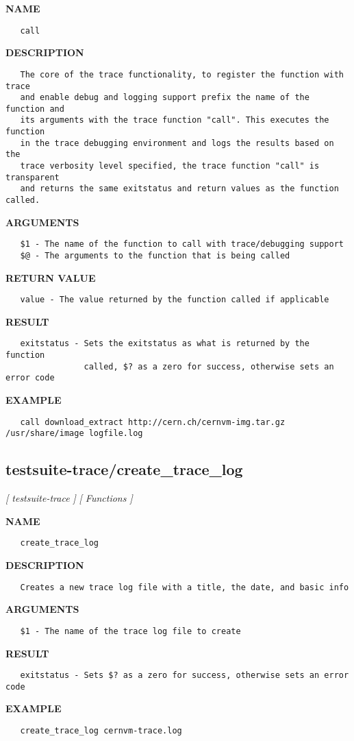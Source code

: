 \label{ch:robo50}
\label{ch:testsuite_trace_call}
\textbf{NAME}
\begin{verbatim}
   call
\end{verbatim}
\textbf{DESCRIPTION}
\begin{verbatim}
   The core of the trace functionality, to register the function with trace
   and enable debug and logging support prefix the name of the function and
   its arguments with the trace function "call". This executes the function
   in the trace debugging environment and logs the results based on the 
   trace verbosity level specified, the trace function "call" is transparent
   and returns the same exitstatus and return values as the function called.
\end{verbatim}
\textbf{ARGUMENTS}
\begin{verbatim}
   $1 - The name of the function to call with trace/debugging support
   $@ - The arguments to the function that is being called
\end{verbatim}
\textbf{RETURN VALUE}
\begin{verbatim}
   value - The value returned by the function called if applicable
\end{verbatim}
\textbf{RESULT}
\begin{verbatim}
   exitstatus - Sets the exitstatus as what is returned by the function
                called, $? as a zero for success, otherwise sets an error code
\end{verbatim}
\textbf{EXAMPLE}
\begin{verbatim}
   call download_extract http://cern.ch/cernvm-img.tar.gz /usr/share/image logfile.log
\end{verbatim}
\newpage
\subsection{testsuite-trace/create\_trace\_log}
\textsl{[ testsuite-trace ]}
\textsl{[ Functions ]}

\label{ch:robo51}
\label{ch:testsuite_trace_create_trace_log}
\textbf{NAME}
\begin{verbatim}
   create_trace_log
\end{verbatim}
\textbf{DESCRIPTION}
\begin{verbatim}
   Creates a new trace log file with a title, the date, and basic info
\end{verbatim}
\textbf{ARGUMENTS}
\begin{verbatim}
   $1 - The name of the trace log file to create
\end{verbatim}
\textbf{RESULT}
\begin{verbatim}
   exitstatus - Sets $? as a zero for success, otherwise sets an error code
\end{verbatim}
\textbf{EXAMPLE}
\begin{verbatim}
   create_trace_log cernvm-trace.log
\end{verbatim}
\newpage
